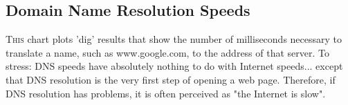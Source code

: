 \documentclass[letterpaper,12pt]{article}
\begin{document}
\newpage
\begin{landscape}
\section{Domain Name Resolution Speeds}

\lettrine{T}{his}
chart plots 'dig' results that show the number of milliseconds necessary to translate a name, such as www.google.com, to the address of that server.  To stress: DNS speeds have absolutely nothing to do with Internet speeds... except that DNS resolution is the very first step of opening a web page.  Therefore, if DNS resolution has problems, it is often perceived as "the Internet is slow".  
\begin{center}
\label{visina8}%
\end{center}
\end{landscape}
\end{document}
